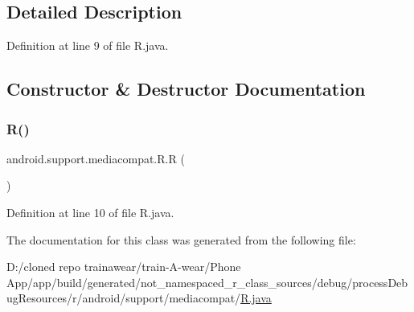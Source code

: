 \subsection{Detailed Description}


Definition at line 9 of file R.\+java.



\subsection{Constructor \& Destructor Documentation}
\mbox{\label{classandroid_1_1support_1_1mediacompat_1_1_r_a57c7ac186b73e61e21481806c097f290}} 
\subsubsection{\texorpdfstring{R()}{R()}}
{\footnotesize\ttfamily android.\+support.\+mediacompat.\+R.\+R (\begin{DoxyParamCaption}{ }\end{DoxyParamCaption})\hspace{0.3cm}{\ttfamily [private]}}



Definition at line 10 of file R.\+java.


\begin{DoxyCode}{0}

\end{DoxyCode}


The documentation for this class was generated from the following file\+:\begin{DoxyCompactItemize}
\item 
D\+:/cloned repo trainawear/train-\/\+A-\/wear/\+Phone App/app/build/generated/not\+\_\+namespaced\+\_\+r\+\_\+class\+\_\+sources/debug/process\+Debug\+Resources/r/android/support/mediacompat/\mbox{\hyperlink{process_debug_resources_2r_2android_2support_2mediacompat_2_r_8java}{R.\+java}}\end{DoxyCompactItemize}
